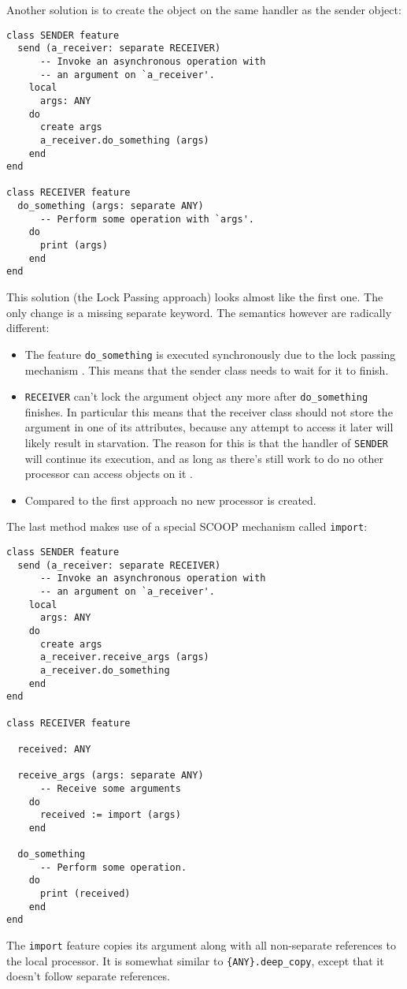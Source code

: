 Another solution is to create the object on the same handler as the sender object:
\begin{lstlisting}[language=OOSC2Eiffel, captionpos=b, caption={Migrate objects with lock passing.}]
class SENDER feature
  send (a_receiver: separate RECEIVER)
      -- Invoke an asynchronous operation with
      -- an argument on `a_receiver'.
    local
      args: ANY
    do
      create args
      a_receiver.do_something (args)
    end
end

class RECEIVER feature 
  do_something (args: separate ANY)
      -- Perform some operation with `args'.
    do
      print (args)
    end
end
\end{lstlisting}
This solution (the Lock Passing approach) looks almost like the first one.
The only change is a missing separate keyword.
The semantics however are radically different:

\begin{itemize}
 \item The feature \lstinline!do_something! is executed synchronously due to the lock passing mechanism \cite[p. 152]{Nienaltowski07}\cite{web:scoop}.
 This means that the sender class needs to wait for it to finish.
 \item \lstinline!RECEIVER! can't lock the argument object any more after \lstinline!do_something! finishes.
 In particular this means that the receiver class should not store the argument in one of its attributes, because any attempt to access it later will likely result in starvation.
 The reason for this is that the handler of \lstinline!SENDER! will continue its execution, and as long as there's still work to do no other processor can access objects on it .
 \item Compared to the first approach no new processor is created.
\end{itemize}

The last method makes use of a special SCOOP mechanism called \lstinline!import!:
\begin{lstlisting}[language=OOSC2Eiffel, captionpos=b, caption={Migrate objects with import.}]
class SENDER feature
  send (a_receiver: separate RECEIVER)
      -- Invoke an asynchronous operation with
      -- an argument on `a_receiver'.
    local
      args: ANY
    do
      create args
      a_receiver.receive_args (args)
      a_receiver.do_something
    end
end

class RECEIVER feature
  
  received: ANY
  
  receive_args (args: separate ANY)
      -- Receive some arguments
    do
      received := import (args)
    end

  do_something
      -- Perform some operation.
    do
      print (received)
    end
end
\end{lstlisting}
The \lstinline!import! feature copies its argument along with all non-separate references to the local processor.
It is somewhat similar to \lstinline!{ANY}.deep_copy!, except that it doesn't follow separate references.

